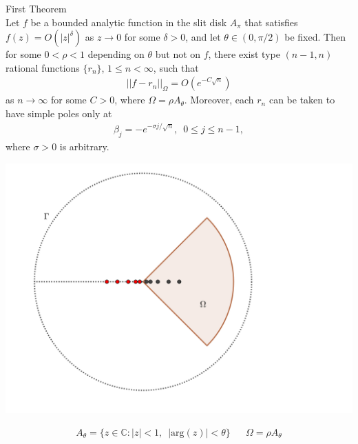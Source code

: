 \documentclass{seminar}
\begin{document}
\begin{slide} %
\large First Theorem \\

\small
Let $f$ be a bounded analytic function in the slit disk $A_\pi$ that satisfies $f(z)=O(|z|^\delta)$ as $z \to 0$ for some $\delta > 0$, and let $\theta \in (0,\pi /2)$ be fixed. Then for some $0< \rho < 1$ depending on $\theta$ but not on $f$, there exist type $(n-1,n)$ rational functions $\{r_n\}$, $1 \leq n < \infty$, such that
	\begin{align*}
	||f-r_n||_\Omega = O(e^{-C \sqrt{n}})
	\end{align*}
as $n \to \infty $ for some $C>0$, where $\Omega = \rho A_\theta$. Moreover, each $r_n$ can be taken to have simple poles only at
	\begin{align*}
	\beta_j = -e^{-\sigma j/\sqrt{n}}, \enspace 0\leq j \leq n-1,
	\end{align*}
where $\sigma >0$ is arbitrary.
\end{slide} %




\begin{slide} %
\begin{center}
\includegraphics[scale=0.8]{./PNG/A_theta_illust}
\end{center}

\begin{align*}
A_\theta=\{z \in \mathds{C} : |z|<1,\enspace |\mathrm{arg}(z)|<\theta \} &&
\Omega = \rho A_\theta
\end{align*}
\end{slide} %
\end{document}
